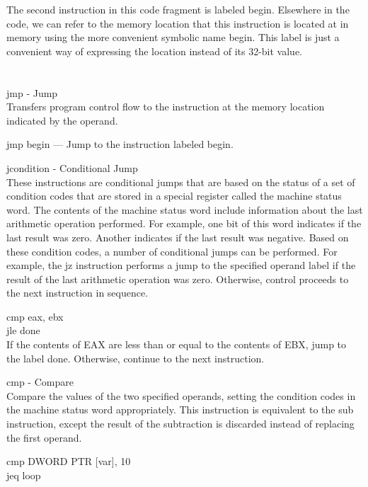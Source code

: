 \documentclass[12pt]{extarticle}
\begin{document}
The second instruction in this code fragment is labeled begin. Elsewhere in the code, we can refer to the memory location that this instruction is located at in memory using the more convenient symbolic name begin. This label is just a convenient way of expressing the location instead of its 32-bit value.
\\
\\\\
jmp - Jump \\

Transfers program control flow to the instruction at the memory location indicated by the operand.

\begin{center}
    jmp begin — Jump to the instruction labeled begin. 
\end{center}

jcondition - Conditional Jump \\

These instructions are conditional jumps that are based on the status of a set of condition codes that are stored in a special register called the machine status word. The contents of the machine status word include information about the last arithmetic operation performed. For example, one bit of this word indicates if the last result was zero. Another indicates if the last result was negative. Based on these condition codes, a number of conditional jumps can be performed. For example, the jz instruction performs a jump to the specified operand label if the result of the last arithmetic operation was zero. Otherwise, control proceeds to the next instruction in sequence. 

\begin{center}
    cmp eax, ebx \\
    jle done \\
    If the contents of EAX are less than or equal to the contents of EBX, jump to the label done. Otherwise, continue to the next instruction. 

\end{center}

cmp - Compare \\

Compare the values of the two specified operands, setting the condition codes in the machine status word appropriately. This instruction is equivalent to the sub instruction, except the result of the subtraction is discarded instead of replacing the first operand. 

\begin{center}
    cmp DWORD PTR [var], 10 \\
jeq loop
\end{center}
\end{document}
